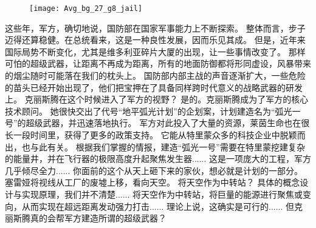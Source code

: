 \documentclass[openany]{book}
\begin{document}
\begin{figure}[h]
    \centering
    \texttt{[image: Avg\_bg\_27\_g8\_jail]}
\end{figure}
\begin{dialogue}
     这些年，军方，确切地说，国防部在国家军事能力上不断探索。
     整体而言，步子迈得还算稳健。在总统看来，这是一种良性发展，因而乐见其成。
     但是，近年来国际局势不断变化，尤其是维多利亚碎片大厦的出现，让一些事情改变了。
     那样可怕的超级武器，让距离不再成为距离，所有的地面防御都将形同虚设，风暴带来的烟尘随时可能落在我们的枕头上。
     国防部内部主战的声音逐渐扩大，一些危险的苗头已经开始出现了，他们把宝押在了具备同样跨时代意义的战略武器的研发上。
     克丽斯腾在这个时候进入了军方的视野？
     是的。克丽斯腾成为了军方的核心技术顾问。
     她很快交出了代号“地平弧光计划”的企划案，计划建造名为“弧光一号”的超级武器，并迅速落地执行。
     军方对此投入了大量的资源，莱茵生命也在很长一段时间里，获得了更多的政策支持。
     它能从特里蒙众多的科技企业中脱颖而出，也与此有关。
     根据我们掌握的情报，建造“弧光一号”需要在特里蒙挖建复杂的能量井，并在飞行器的极限高度升起聚焦发生器......
     这是一项庞大的工程，军方几乎倾尽全力......
     你面前的这个从天上砸下来的家伙，想必就是计划的一部分。
    塞雷娅将视线从工厂的废墟上移，看向天空。
     将天空作为中转站？
     具体的概念设计与实现原理，我们并不清楚......
     将天空作为中转站，将巨量的能源进行聚焦或变向，从而实现在超远距离发动强力打击......
     理论上说，这确实是可行的......
     但克丽斯腾真的会帮军方建造所谓的超级武器？
\end{dialogue}
\end{document}
